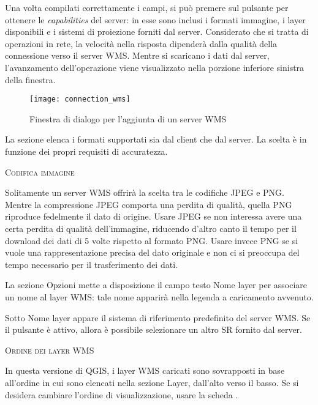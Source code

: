 Una volta compilati correttamente i campi, si può premere sul pulsante
 per ottenere le \textit{capabilities} del server: in esse sono inclusi
i formati immagine, i layer disponibili e i sistemi di proiezione forniti dal
server. Considerato che si tratta di operazioni in rete, la velocità nella
risposta dipenderà dalla qualità della connessione verso il server WMS. Mentre
si scaricano i dati dal server, l'avanzamento dell'operazione viene
visualizzato nella porzione inferiore sinistra della finestra. 

\begin{figure}[ht]
  \centering
  \texttt{[image: connection\_wms]}
  \caption{Finestra di dialogo per l'aggiunta di un server WMS \nixcaption}\label{fig:connection_wms}
\end{figure}


La sezione  elenca i formati supportati sia dal client
che dal  server. La scelta è in funzione dei propri requisiti di accuratezza.

\begin{Tip}[ht]\caption{\textsc{Codifica immagine}}
Solitamente un server WMS offrirà la scelta tra le codifiche JPEG e
PNG. Mentre la compressione JPEG comporta una perdita di qualità, quella PNG
riproduce fedelmente il dato di origine. Usare JPEG se non interessa avere una
certa perdita di qualità dell'immagine, riducendo d'altro canto il tempo per
il download dei dati di 5 volte rispetto al formato PNG. Usare invece PNG se
si vuole una rappresentazione precisa del dato originale e non ci si preoccupa
del tempo necessario per il trasferimento dei dati.
\end{Tip}


La sezione Opzioni mette a disposizione il campo testo Nome layer per associare un nome al layer WMS: 
tale nome apparirà nella legenda a caricamento avvenuto. 

Sotto Nome layer appare il sistema di riferimento predefinito del server WMS. 
Se il pulsante  è attivo, allora è possibile selezionare un altro SR fornito dal server.

\begin{Tip}[ht]\caption{\textsc{Ordine dei layer WMS}}
In questa versione di QGIS, i layer WMS caricati sono sovrapposti in
base all'ordine in cui sono elencati nella sezione Layer, dall'alto verso il
basso. Se si desidera cambiare l'ordine di visualizzazione, usare la scheda .
\end{Tip}

